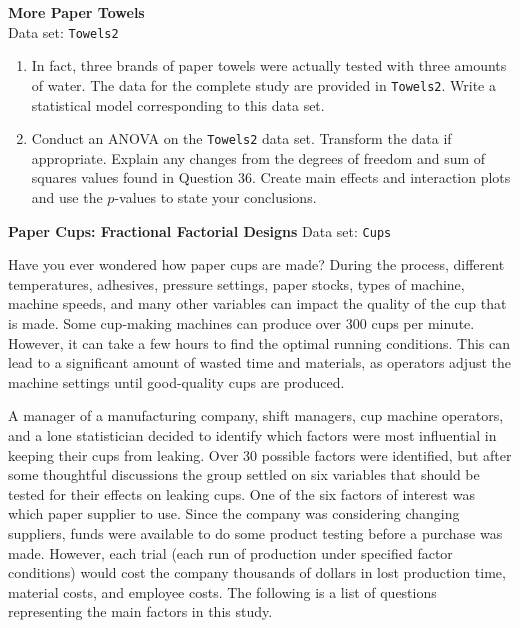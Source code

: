 \documentclass[
]{report}
\begin{document}
\begin{list}{E.}{ \setlength{\itemsep}{1.2em}}
  \item \textbf{More Paper Towels}\\
  Data set: \texttt{Towels2}
  \begin{enumerate}
    \item In fact, three brands of paper towels were actually tested with three amounts of water. The data for the complete study are provided in \texttt{Towels2}. Write a statistical model corresponding to this data set.
    \item Conduct an ANOVA on the \texttt{Towels2} data set. Transform the data if appropriate. Explain any changes from the degrees of freedom and sum of squares values found in Question 36. Create main effects and interaction plots and use the $p$-values to state your conclusions.
  \end{enumerate}

  \item \textbf{Paper Cups: Fractional Factorial Designs}
  Data set: \texttt{Cups}

Have you ever wondered how paper cups are made? During the process, different temperatures, adhesives, pressure settings, paper stocks, types of machine, machine speeds, and many other variables can impact the quality of the cup that is made. Some cup-making machines can produce over 300 cups per minute. However, it can take a few hours to find the optimal running conditions. This can lead to a significant amount of wasted time and materials, as operators adjust the machine settings until good-quality cups are produced.

A manager of a manufacturing company, shift managers, cup machine operators, and a lone statistician decided to identify which factors were most influential in keeping their cups from leaking. Over 30 possible factors were identified, but after some thoughtful discussions the group settled on six variables that should be tested for their effects on leaking cups. One of the six factors of interest was which paper supplier to use. Since the company was considering changing suppliers, funds were available to do some product testing before a purchase was made. However, each trial (each run of production under specified factor conditions) would cost the company thousands of dollars in lost production time, material costs, and employee costs. The following is a list of questions representing the main factors in this study.
  

\end{list}
\end{document}
